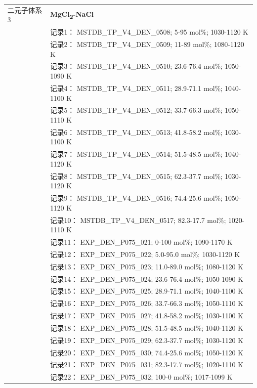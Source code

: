 \documentclass[12pt]{article}
\begin{document}
{\begin{longtable}[]{@{}
  >{\raggedright\arraybackslash}p{}
  >{\raggedright\arraybackslash}p{}@{}}
二元子体系 3  & \textbf{MgCl\textsubscript{2}-NaCl} \\
 & 记录1： MSTDB\_TP\_V4\_DEN\_0508; 5-95 mol\%; 1030-1120 K \\
 & 记录2： MSTDB\_TP\_V4\_DEN\_0509; 11-89 mol\%; 1080-1120 K \\
 & 记录3： MSTDB\_TP\_V4\_DEN\_0510; 23.6-76.4 mol\%; 1050-1090 K \\
 & 记录4： MSTDB\_TP\_V4\_DEN\_0511; 28.9-71.1 mol\%; 1040-1100 K \\
 & 记录5： MSTDB\_TP\_V4\_DEN\_0512; 33.7-66.3 mol\%; 1050-1110 K \\
 & 记录6： MSTDB\_TP\_V4\_DEN\_0513; 41.8-58.2 mol\%; 1030-1100 K \\
 & 记录7： MSTDB\_TP\_V4\_DEN\_0514; 51.5-48.5 mol\%; 1040-1120 K \\
 & 记录8： MSTDB\_TP\_V4\_DEN\_0515; 62.3-37.7 mol\%; 1030-1120 K \\
 & 记录9： MSTDB\_TP\_V4\_DEN\_0516; 74.4-25.6 mol\%; 1050-1120 K \\
 & 记录10： MSTDB\_TP\_V4\_DEN\_0517; 82.3-17.7 mol\%; 1020-1110 K \\
 & 记录11： EXP\_DEN\_P075\_021; 0-100 mol\%; 1090-1170 K \\
 & 记录12： EXP\_DEN\_P075\_022; 5.0-95.0 mol\%; 1030-1120 K \\
 & 记录13： EXP\_DEN\_P075\_023; 11.0-89.0 mol\%; 1080-1120 K \\
 & 记录14： EXP\_DEN\_P075\_024; 23.6-76.4 mol\%; 1050-1090 K \\
 & 记录15： EXP\_DEN\_P075\_025; 28.9-71.1 mol\%; 1040-1100 K \\
 & 记录16： EXP\_DEN\_P075\_026; 33.7-66.3 mol\%; 1050-1110 K \\
 & 记录17： EXP\_DEN\_P075\_027; 41.8-58.2 mol\%; 1030-1100 K \\
 & 记录18： EXP\_DEN\_P075\_028; 51.5-48.5 mol\%; 1040-1120 K \\
 & 记录19： EXP\_DEN\_P075\_029; 62.3-37.7 mol\%; 1030-1120 K \\
 & 记录20： EXP\_DEN\_P075\_030; 74.4-25.6 mol\%; 1050-1120 K \\
 & 记录21： EXP\_DEN\_P075\_031; 82.3-17.7 mol\%; 1020-1110 K \\
 & 记录22： EXP\_DEN\_P075\_032; 100-0 mol\%; 1017-1099 K  \\


\end{longtable}}
\end{document}
